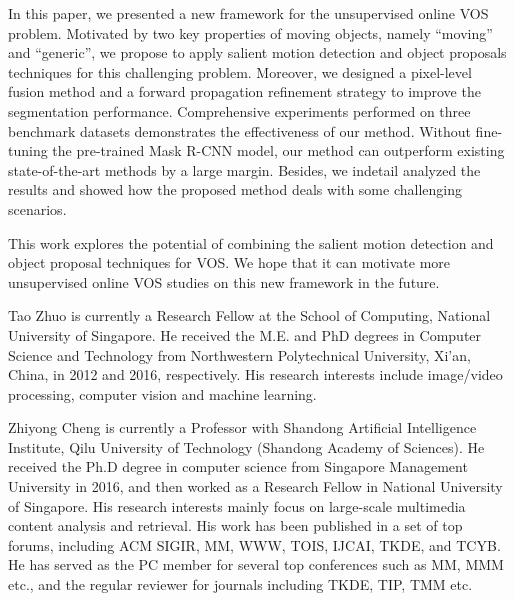 \documentclass[journal]{IEEEtran}
\begin{document}
In this paper, we presented a new framework for the unsupervised online VOS problem.  Motivated by two key properties of moving objects, namely ``moving'' and ``generic'', we propose to apply salient motion detection and object proposals techniques for this challenging problem. Moreover, we designed a pixel-level fusion method and a forward propagation refinement strategy to improve the segmentation performance. Comprehensive experiments performed on three benchmark datasets demonstrates the effectiveness of our method. Without fine-tuning the pre-trained Mask R-CNN model, our method can outperform existing state-of-the-art methods by a large margin. Besides, we indetail analyzed the results and showed how the proposed method deals with some challenging scenarios. 

This work explores the potential of combining the salient motion detection and object proposal techniques for VOS. We hope that it can motivate more unsupervised online VOS studies on this new framework in the future. 
\ifCLASSOPTIONcaptionsoff
  \newpage
\fi




\begin{IEEEbiography}{Tao Zhuo}
	is currently a Research Fellow at the School of Computing, National University of Singapore. He received the M.E. and PhD degrees in Computer Science and Technology from Northwestern Polytechnical University, Xi’an, China, in 2012 and 2016, respectively. His research interests include image/video processing, computer vision and machine learning.
\end{IEEEbiography}


\begin{IEEEbiography}{Zhiyong Cheng}
	is currently a Professor with Shandong Artificial Intelligence Institute, Qilu University of Technology (Shandong Academy of Sciences). He received the Ph.D degree in computer science from Singapore Management University in 2016, and then worked as a Research Fellow in National University of Singapore. His research interests mainly focus on large-scale multimedia content analysis and retrieval. His work has been published in a set of top forums, including ACM SIGIR, MM, WWW, TOIS, IJCAI, TKDE, and TCYB. He has served as the PC member for several top conferences such as MM, MMM etc., and the regular reviewer for journals including TKDE, TIP, TMM etc.
\end{IEEEbiography}
\end{document}
